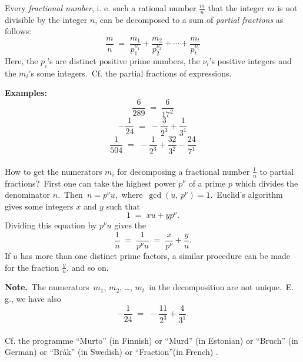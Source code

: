 \documentclass[12pt]{article}
\begin{document}
Every {\em fractional number}, i. e. such a rational number $\frac {m}{n}$ that the integer $m$ is not divisible by the integer $n$, can be decomposed to a sum of {\em partial fractions} as follows:
$$\frac{m}{n} \;=\; \frac{m_1}{p_1^{\nu_1}}+\frac{m_2}{p_2^{\nu_2}}+\cdots+\frac{m_t}{p_t^{\nu_t}}$$
Here, the $p_i$'s are distinct positive prime numbers, the $\nu_i$'s positive integers and the $m_i$'s some integers.\, Cf. the partial fractions of expressions.

\textbf{Examples:} 
 $$\frac{6}{289} \;=\; \frac{6}{17^2}$$ 
 $$-\frac{1}{24} \;=\; -\frac{3}{2^3}+\frac{1}{3^1}$$
 $$\frac{1}{504} \;=\; -\frac{1}{2^3}+\frac{32}{3^2}-\frac{24}{7^1}$$\\

How to get the numerators $m_i$ for decomposing a fractional number $\frac{1}{n}$ to partial fractions?\, First one can take the highest power $p^{\nu}$ of a prime $p$ which divides the denominator $n$.\, Then\, $n = p^{\nu}u$,\, where\, $\gcd{(u,\,p^{\nu})} = 1$.\, Euclid's algorithm gives some integers $x$ and $y$ such that 
                     $$1 \;=\; xu\!+\!yp^{\nu}.$$
Dividing this equation by $p^{\nu}u$ gives the 
  $$\frac{1}{n} \;=\; \frac{1}{p^{\nu}u} \;=\; \frac{x}{p^{\nu}}\!+\!\frac{y}{u}.$$
If $u$ has more than one distinct prime factors, a similar procedure can be made for the fraction $\frac{y}{u}$, and so on.

\textbf{Note.}\, The numerators\, $m_1$, $m_2$, \ldots, $m_t$\, in the decomposition are not unique.\, E. g., we have also
          $$-\frac{1}{24} \;=\; -\frac{11}{2^3}+\frac{4}{3^1}.$$\\

Cf. the programme ``Murto'' (in Finnish) or ``Murd'' (in Estonian) or ``Bruch'' (in German) or ``Br\aa k'' (in Swedish) or ``Fraction''(in French) . 

\end{document}
